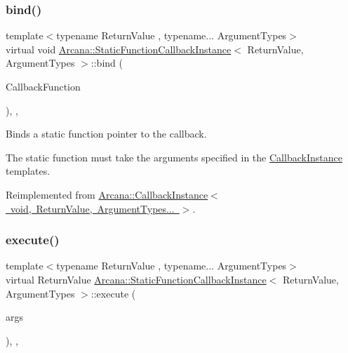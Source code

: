 \subsubsection{\texorpdfstring{bind()}{bind()}}
{\footnotesize\ttfamily template$<$typename Return\+Value , typename... Argument\+Types$>$ \\
virtual void \mbox{\hyperlink{class_arcana_1_1_static_function_callback_instance}{Arcana\+::\+Static\+Function\+Callback\+Instance}}$<$ Return\+Value, Argument\+Types $>$\+::bind (\begin{DoxyParamCaption}\item[{\mbox{\hyperlink{class_arcana_1_1_static_function_callback_instance_a2df756266028ab7af5c4253fbfb230dc}{Callback\+Function}}}]{Callback\+Function }\end{DoxyParamCaption})\hspace{0.3cm}{\ttfamily [inline]}, {\ttfamily [override]}, {\ttfamily [virtual]}}



Binds a static function pointer to the callback. 

The static function must take the arguments specified in the \mbox{\hyperlink{class_arcana_1_1_callback_instance}{Callback\+Instance}} templates. 

Reimplemented from \mbox{\hyperlink{class_arcana_1_1_callback_instance_a6d9b12af5b8a98b782257a7b10eaa7e9}{Arcana\+::\+Callback\+Instance$<$ void, Return\+Value, Argument\+Types... $>$}}.

\mbox{\label{class_arcana_1_1_static_function_callback_instance_a9666f5e80b24e6e38e5d3766a6a577ac}} 
\subsubsection{\texorpdfstring{execute()}{execute()}}
{\footnotesize\ttfamily template$<$typename Return\+Value , typename... Argument\+Types$>$ \\
virtual Return\+Value \mbox{\hyperlink{class_arcana_1_1_static_function_callback_instance}{Arcana\+::\+Static\+Function\+Callback\+Instance}}$<$ Return\+Value, Argument\+Types $>$\+::execute (\begin{DoxyParamCaption}\item[{Argument\+Types \&\&...}]{args }\end{DoxyParamCaption})\hspace{0.3cm}{\ttfamily [inline]}, {\ttfamily [override]}, {\ttfamily [virtual]}}



